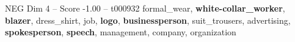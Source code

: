 \begin{textsample}{NEG Dim 4 – Score -1.00 – t000932}  \label{ex:f4_neg_010}
formal\_wear, \textbf{white-collar\_worker}, \textbf{blazer}, dress\_shirt, job, \textbf{logo}, \textbf{businessperson}, suit\_trousers, advertising, \textbf{spokesperson}, \textbf{speech}, management, company, organization

\end{textsample}
